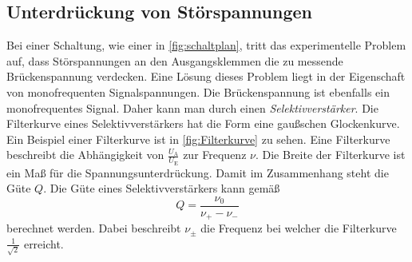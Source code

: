 \subsection{Unterdrückung von Störspannungen}
\label{subsec:unterdrückung}
Bei einer Schaltung, wie einer in \autoref{fig:schaltplan}, tritt das experimentelle Problem auf, dass Störspannungen an den Ausgangsklemmen die zu messende Brückenspannung
verdecken. Eine Lösung dieses Problem liegt in der Eigenschaft von monofrequenten Signalspannungen. Die Brückenspannung ist ebenfalls ein monofrequentes Signal. Daher kann man
durch einen \textit{Selektivverstärker}. Die Filterkurve eines Selektivverstärkers hat die Form eine gaußschen Glockenkurve. Ein Beispiel einer Filterkurve ist in \autoref{fig:Filterkurve}
zu sehen. Eine Filterkurve beschreibt die Abhängigkeit von
$\frac{U_{\text{A}}}{U_{\text{E}}}$ zur Frequenz $\nu$. Die Breite der Filterkurve ist ein Maß für die Spannungsunterdrückung. Damit im Zusammenhang steht die Güte $Q$. Die
Güte eines Selektivverstärkers kann gemäß
\begin{equation}
    Q = \frac{\nu_0}{\nu_+ - \nu_-}
\end{equation}
berechnet werden. Dabei beschreibt $\nu_{\pm}$ die Frequenz bei welcher die Filterkurve $\frac{1}{\sqrt{2}}$ erreicht.
